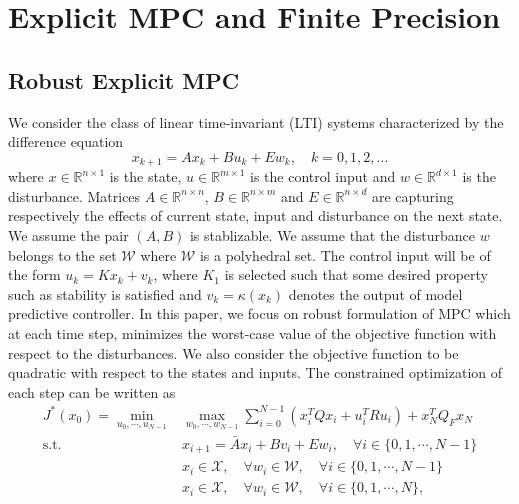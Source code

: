 \section{Explicit MPC and Finite Precision}
\subsection{Robust Explicit MPC}
\def\reals{\mathbb{R}}
We consider the class of linear time-invariant (LTI) systems characterized by the difference equation
\begin{equation}
\label{eq:DSS}
x_{k+1}=Ax_k+Bu_k+Ew_k,\quad  k=0,1,2,\ldots
\end{equation}
where $x\in \reals^{n\times 1}$ is the state, $u\in \reals^{m\times 1}$ is the control input and $w\in \reals^{d\times 1}$ is the disturbance. Matrices $A\in \reals^{n\times n}$, $B\in \reals^{n\times m}$ and $E\in \reals^{n\times d}$ are capturing respectively the effects of current state, input and disturbance on the next state. We assume the pair $(A,B)$ is stablizable.
We assume that the disturbance $w$ belongs to the set $\mathcal{W}$ where $\mathcal{W}$ is a polyhedral set. The control input will be of the form $u_k=Kx_k+v_k$, where $K_1$ is selected such that some desired property such as stability is satisfied and $v_k=\kappa(x_k)$ denotes the output of model predictive controller. 
In this paper, we focus on robust formulation of MPC which at each time step, minimizes the worst-case value of the objective function with respect to the disturbances. We also consider the objective function to be quadratic with respect to the states and inputs. The constrained optimization of each step can be written as
\begin{align}
\label{eq:RMPC_prob}
J^{\ast}(x_0)=\min_{u_0,\cdots,u_{N-1}}& \max_{w_0,\cdots,w_{N-1}} \sum_{i=0}^{N-1}(x_i^TQx_i+u_i^TRu_i) + x_N^TQ_Fx_N\nonumber\\
\text{s.t.} \quad &x_{i+1}=\bar Ax_i+Bv_i + E w_i, \quad\forall i\in\{0,1,\cdots,N-1\}\nonumber\\
&x_i\in\mathcal{X},\quad \forall w_i\in\mathcal{W}, \quad\forall i\in\{0,1,\cdots,N-1\}\nonumber\\
&x_i\in\mathcal{X},\quad \forall w_i\in\mathcal{W},\quad\forall i\in\{0,1,\cdots,N\},
\end{align}

